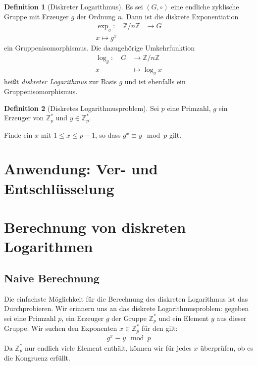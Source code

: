 \documentclass[
  a4paper,
  11pt,
]{scrartcl}
\theoremstyle{plain}
\theoremstyle{definition}
\newtheorem{definition}{Definition}
\theoremstyle{remark}
\newcommand{\Z}{\mathbb{Z}}
\begin{document}
\begin{definition}[Diskreter Logarithmus]
  Es sei $(G, \circ)$ eine endliche zyklische Gruppe mit Erzeuger $g$ der
  Ordnung $n$. Dann ist die diskrete Exponentiation
  \begin{align*}
    \exp_g: \quad \Z/n\Z & \to G\\
    x \mapsto g^x
  \end{align*}
  ein Gruppenisomorphismus. Die dazugehörige Umkehrfunktion
  \begin{align*}
    \log_g: \quad G & \to \Z/n\Z\\
    x & \mapsto \log_g x
  \end{align*}
  heißt \emph{diskreter Logarithmus} zur Basis $g$ und ist ebenfalls ein
  Gruppenisomorphismus.
\end{definition}

\begin{definition}[Diskretes Logarithmusproblem]\label{def:diskretes_logarithmusproblem}
  Sei $p$ eine Primzahl, $g$ ein Erzeuger von $\Z_p^*$ und $y \in \Z_p^*$.

  Finde ein $x$ mit $1 \leq x \leq p-1$, so dass $g^x \equiv y \mod p$ gilt.
\end{definition}

\section{Anwendung: Ver- und Entschlüsselung}
\label{sec:anwendung_ver_und_entschlusselung}

\section{Berechnung von diskreten Logarithmen}
\label{sec:berechnung_von_diskreten_logarithmen}

\subsection{Naive Berechnung}
\label{sub:naive_berechnung}

Die einfachste Möglichkeit für die Berechnung des diskreten Logarithmus ist das
Durchprobieren. Wir erinnern uns an das  diskrete
Logarithmusproblem: gegeben sei eine Primzahl $p$, ein
Erzeuger $g$ der Gruppe $\Z_p^*$ und ein Element $y$ aus dieser Gruppe. Wir
suchen den Exponenten $x \in \Z_p^*$ für den gilt:
\begin{align*}
  g^x \equiv y \mod p
\end{align*}
Da $\Z_p^*$ nur endlich viele Element enthält, können wir für jedes $x$
überprüfen, ob es die Kongruenz erfüllt.
\end{document}
